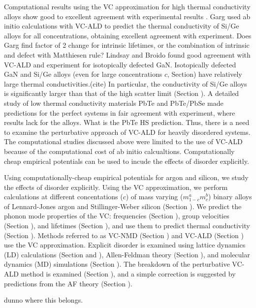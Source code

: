 \documentclass[aps,prb,onecolumn,preprint,superscriptaddress,amsmath,amssymb,floatfix]{revtex4}
\begin{document}
Computational results using the VC approximation 
for high thermal conductivity 
alloys show good to excellent agreement with experimental results
\cite{garg_role_2011,lindsay_thermal_2012}.
Garg used ab initio calculations with VC-ALD   
to predict the thermal conductivity of Si/Ge alloys 
for all concentrations, obtaining excellent agreement with experiment.
\cite{garg_role_2011}  
Does Garg find factor of 2 change for intrinsic lifetimes, or the 
combination of intrinsic and defect with Matthiesen rule?
Lindsay and Broido 
found good agreement with VC-ALD and experiment for 
isotopically defected GaN.\cite{lindsay_thermal_2012}  
Isotopically defected GaN and Si/Ge alloys (even for large 
concentrations $c$, Section) have relatively large 
thermal conductivities.(cite) In 
particular, the conductivity of Si/Ge alloys is significantly 
larger than that of the high scatter limit (Section ). 
A detailed study of low thermal conductivity materials 
PbTe\cite{shiga_microscopic_2012} and PbTe/PbSe\cite{tian_phonon_2012} 
made predictions for the perfect systems in fair agreement with 
experiment, where results lack for the alloys. What is the PbTe HS 
prediction. 
Thus, there is a need to examine the perturbative approach of 
VC-ALD for heavily disordered systems. 
The computational studies discussed above were limited to the use 
of VC-ALD because of the computational cost of ab initio calcualtions. 
Computationally cheap empirical potentials can be used to incude 
the effects of disorder explicitly.

Using computationally-cheap empirical potentials for argon 
and silicon\cite{stillinger_computer_1985},  
we study the effects of disorder explicitly. 
Using the VC approximation, 
we perform calculations at different concentations ($c$) 
of mass varying ($m^a_{1-c}m^b_{c}$) binary alloys of Lennard-Jones 
argon and Stillinger-Weber silicon (Section ). We predict 
the phonon mode properties of the VC:  
frequencies (Section ), group velocities (Section ),  
and lifetimes (Section ), and use them to predict thermal
conductivity (Section ). Methods referred to as VC-NMD (Section )
and VC-ALD (Section ) use the VC approximation. Explicit disorder 
is examined using lattice dynamics (LD) calculations 
(Section and ), Allen-Feldman theory (Section ),\cite{allen_thermal_1993} 
and molecular dynamics (MD) simulations 
(Section ). The breakdown of the perturbative VC-ALD method is examined 
(Section ), and a simple correction is suggested by predictions from 
the AF theory (Section ). 

dunno where this belongs. 
\end{document}
